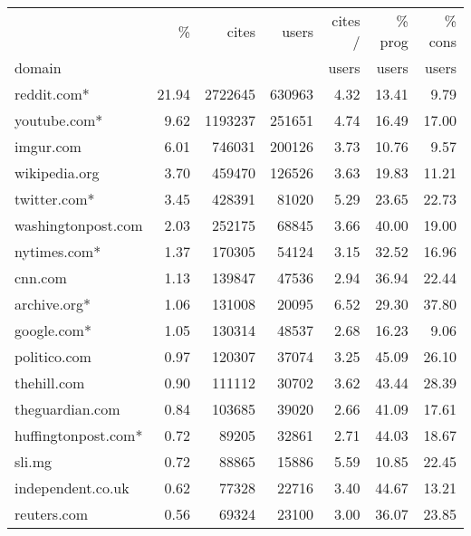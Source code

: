 \begin{tabular}{lrrrrrr}
\toprule
{} & \% & cites & users &  cites / & \% prog & \% cons \\
domain &  &  &  & users & users & users \\
\midrule
reddit.com*           &   21.94 &   2722645 &   630963 &         4.32 &         13.41 &          9.79 \\
youtube.com*          &    9.62 &   1193237 &   251651 &         4.74 &         16.49 &         17.00 \\
imgur.com             &    6.01 &    746031 &   200126 &         3.73 &         10.76 &          9.57 \\
wikipedia.org         &    3.70 &    459470 &   126526 &         3.63 &         19.83 &         11.21 \\
twitter.com*          &    3.45 &    428391 &    81020 &         5.29 &         23.65 &         22.73 \\
washingtonpost.com    &    2.03 &    252175 &    68845 &         3.66 &         40.00 &         19.00 \\
nytimes.com*          &    1.37 &    170305 &    54124 &         3.15 &         32.52 &         16.96 \\
cnn.com               &    1.13 &    139847 &    47536 &         2.94 &         36.94 &         22.44 \\
archive.org*          &    1.06 &    131008 &    20095 &         6.52 &         29.30 &         37.80 \\
google.com*           &    1.05 &    130314 &    48537 &         2.68 &         16.23 &          9.06 \\
politico.com          &    0.97 &    120307 &    37074 &         3.25 &         45.09 &         26.10 \\
thehill.com           &    0.90 &    111112 &    30702 &         3.62 &         43.44 &         28.39 \\
theguardian.com       &    0.84 &    103685 &    39020 &         2.66 &         41.09 &         17.61 \\
huffingtonpost.com*   &    0.72 &     89205 &    32861 &         2.71 &         44.03 &         18.67 \\
sli.mg                &    0.72 &     88865 &    15886 &         5.59 &         10.85 &         22.45 \\
independent.co.uk     &    0.62 &     77328 &    22716 &         3.40 &         44.67 &         13.21 \\
reuters.com           &    0.56 &     69324 &    23100 &         3.00 &         36.07 &         23.85 \\

\end{tabular}
